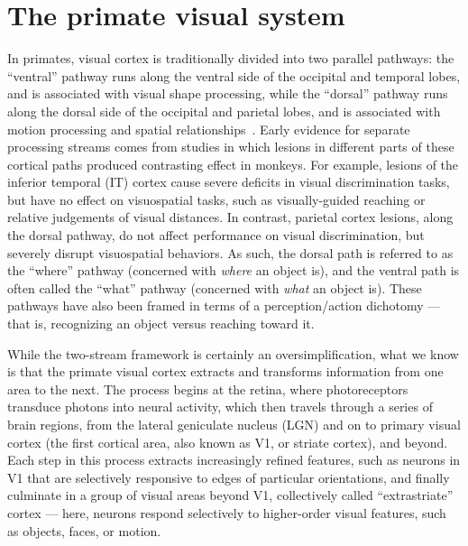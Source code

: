 \section{The primate visual system}
In primates, visual cortex is traditionally divided into two parallel pathways: the ``ventral'' pathway runs along the ventral side of the occipital and temporal lobes, and is associated with visual shape processing, while the  ``dorsal'' pathway runs along the dorsal side of the occipital and parietal lobes, and is associated with motion processing and spatial relationships~\cite{Mishkin1982, Ungerleider1994WhatBrain, Felleman1991}. Early evidence for separate processing streams comes from studies in which lesions in different parts of these cortical paths produced contrasting effect in monkeys. For example, lesions of the inferior temporal (IT) cortex cause severe deficits in visual discrimination tasks, but have no effect on visuospatial tasks, such as visually-guided reaching or relative judgements of visual distances. In contrast, parietal cortex lesions, along the dorsal pathway, do not affect performance on visual discrimination, but severely disrupt visuospatial behaviors. As such, the dorsal path is referred to as the ``where'' pathway (concerned with \textit{where} an object is), and the ventral path is often called the ``what'' pathway (concerned with \textit{what} an object is)\cite{Ungerleider1994WhatBrain}. These pathways have also been framed in terms of a perception/action dichotomy --- that is, recognizing an object versus reaching toward it\cite{Goodale1992}.

While the two-stream framework is certainly an oversimplification, what we know is that the primate visual cortex extracts and transforms information from one area to the next. The process begins at the retina, where photoreceptors transduce photons into neural activity, which then travels through a series of brain regions, from the lateral geniculate nucleus (LGN) and on to primary visual cortex (the first cortical area, also known as V1, or striate cortex), and beyond. Each step in this process extracts increasingly refined features, such as neurons in V1 that are selectively responsive to edges of particular orientations, and finally culminate in a group of visual areas beyond V1, collectively called ``extrastriate'' cortex --- here, neurons respond selectively to higher-order visual features, such as objects, faces, or motion\cite{Orban2008, DiCarlo2012}. 


